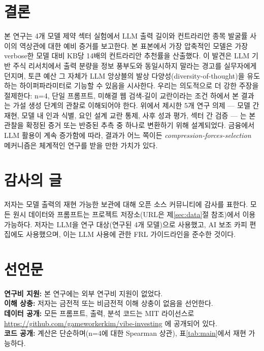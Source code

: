 \documentclass[11pt,letterpaper]{article}
\begin{document}
\section{결론}\label{sec:conclusion}

본 연구는 4개 모델 제약 섹터 실험에서 LLM 출력 길이와 컨트라리안 종목 발굴률 사이의 역상관에 대한 예비 증거를 보고한다. 본 표본에서 가장 압축적인 모델은 가장 verbose한 모델 대비 KB당 14배의 컨트라리안 추천률을 산출했다. 이 발견은 LLM 기반 주식 리서치에서 출력 분량을 정보 풍부도와 동일시하지 말라는 경고를 실무자에게 던지며, 토큰 예산 그 자체가 LLM 앙상블의 발상 다양성(diversity-of-thought)을 유도하는 하이퍼파라미터로 기능할 수 있음을 시사한다. 우리는 의도적으로 더 강한 주장을 절제한다: n=4, 단일 프롬프트, 미해결 웹 검색-길이 교란이라는 조건 하에서 본 결과는 가설 생성 단계의 관찰로 이해되어야 한다. 위에서 제시한 5개 연구 의제 --- 모델 간 재현, 모델 내 인과 식별, 요인 설계 교란 통제, 사후 성과 평가, 섹터 간 검증 --- 는 본 관찰을 확정된 증거 또는 반증된 추측 중 하나로 변환하기 위해 설계되었다. 금융에서 LLM 활용이 계속 증가함에 따라, 결과가 어느 쪽이든 \textit{compression-forces-selection} 메커니즘은 체계적인 연구를 받을 만한 가치가 있다.

\section*{감사의 글}

저자는 모델 출력의 재현 가능한 보관에 대해 오픈 소스 커뮤니티에 감사를 표한다. 모든 원시 데이터와 프롬프트는 프로젝트 저장소(URL은 제\ref{sec:data}절 참조)에서 이용 가능하다. 저자는 LLM을 연구 대상(연구된 4개 모델)으로 사용했고, AI 보조 카피 편집에도 사용했으며, 이는 LLM 사용에 관한 FRL 가이드라인을 준수한 것이다.

\section*{선언문}

\noindent\textbf{연구비 지원:} 본 연구에는 외부 연구비 지원이 없었다.\\
\textbf{이해 상충:} 저자는 금전적 또는 비금전적 이해 상충이 없음을 선언한다.\\
\textbf{데이터 공개:} 모든 프롬프트, 출력, 분석 코드는 MIT 라이선스로 \url{https://github.com/gameworkerkim/vibe-investing} 에 공개되어 있다.\\
\textbf{코드 공개:} 계산은 단순하며(n=4에 대한 Spearman 상관), 표\ref{tab:main}에서 재현 가능하다.
\end{document}
